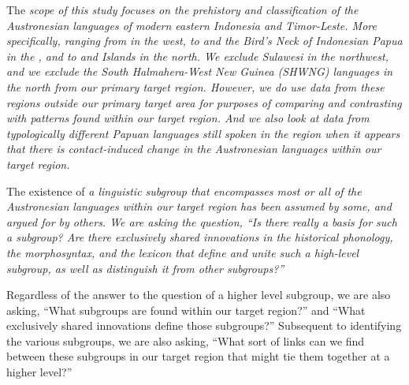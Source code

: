 The \it{scope} of this study focuses on the prehistory and classification
of the Austronesian languages of modern eastern Indonesia and Timor-Leste.
More specifically, ranging from  in the west,
to  and the Bird’s Neck of Indonesian Papua in the ,
and to  and  Islands in the north.
We exclude Sulawesi in the northwest,
and we exclude the South Halmahera-West New Guinea (SHWNG) languages
in the north from our primary target region.
However, we do use data from these regions outside our primary
target area for purposes of comparing and contrasting with patterns found within our target region.
And we also look at data from typologically different Papuan languages
still spoken in the region when it appears that there is contact-induced change
in the Austronesian languages within our target region.

The existence of \it{a linguistic subgroup} that encompasses most or
all of the Austronesian languages within our target region has been assumed by some,
and argued for by others.
We are asking the question, “Is there really a basis for such a subgroup?
Are there exclusively shared innovations in the historical phonology,
the morphosyntax, and the lexicon that define and unite such a high-level subgroup,
as well as distinguish it from other subgroups?”

Regardless of the answer to the question of a higher level subgroup,
we are also asking, “What subgroups are found within our target region?”
and “What exclusively shared innovations define those subgroups?”
Subsequent to identifying the various subgroups, we are also asking,
“What sort of links can we find between these subgroups
in our target region that might tie them together at a higher level?”